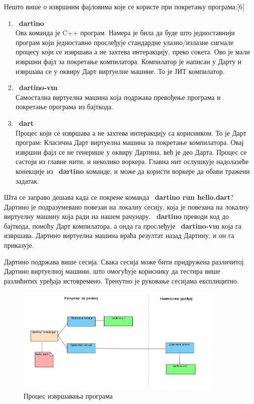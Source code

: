 \documentclass[12pt,oneside]{memoir}
\begin{document}
Нешто више о извршним фајловима које се користе при покретању програма:[6]%
\begin{enumerate}
\item ~\textbf{dartino}\\
Ова команда је C++ програм. Намера је била да буде што једноставнији програм који једноставно прослеђује стандардне улазно/излазне сигнале процесу који се извршава а не захтева интеракцију, преко сокета. Ово је мали извршни фајл за покретање компилатора. Компилатор је написан у Дарту и извршава се у оквиру Дарт виртуелне машине. То је ЈИТ компилатор.
\item ~\textbf{dartino-vm} \\
Самостална виртуелна машина која подржава превођење програма и покретање програма из бајткода.
\item ~\textbf{dart} \\
Процес који се извршава а не захтева интеракцију са корисником. То је Дарт програм: Класична Дарт виртуелна машина за покретање компилатора. Овај извршни фајл се не генерише у оквиру Дартина, већ је део Дарта. Процес се састоји из главне нити, и неколико воркера. Главна нит ослушкује надолазеће конекције из ~\textbf{dartino} команде, и може да користи воркере да обави тражени задатак.
\end{enumerate}

Шта се заправо дешава када се покрене команда ~\textbf{dartino run hello.dart}? Дартино је подразумевано повезан на локалну сесију, која је повезана на локалну виртуелну машину која ради на нашем рачунару. ~\textbf{dartino} преводи код до бајткода, помоћу Дарт компилатора, а онда га прослеђује ~\textbf{dartino-vm} која га извршава. Дартино виртуелна машина враћа резултат назад Дартину, и он га приказује.

Дартино подржава више сесија. Свака сесија може бити придружена различитој Дартино виртуелној машини, што омогућује кориснику да тестира више разлићитих уређаја истовремено. Тренутно је руковање сесијама експлицитно.\cite{Dartino}

\begin{figure}[!ht]
  \centering
  \includegraphics[width=0.9\textwidth]{sesije.png}
  \caption{Процес извршавања програма}
  \label{fig:izvrsavanje}
\end{figure}
\end{document}
